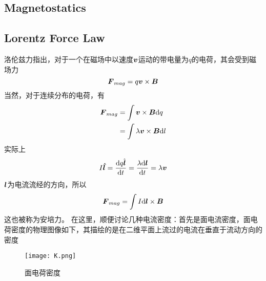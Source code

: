 \documentclass[14pt,oneside]{book}
\begin{document}
\begin{large}
\chapter{Magnetostatics}
\section{Lorentz Force Law}
洛伦兹力指出，对于一个在磁场中以速度$\vb*{v}$运动的带电量为$q$的电荷，其会受到磁场力
\begin{equation}
  \vb*{F}_{mag}=q\vb*{v}\times \vb*{B}
\end{equation}
当然，对于连续分布的电荷，有
\begin{equation}
\begin{aligned}
	 \vb*{ F}_{mag}&=\int \vb*{v}\times \vb*{B} \dd q\\
	 &=\int \lambda \vb*{v}\times \vb*{B} \dd l
\end{aligned}
\end{equation}
实际上
\begin{equation}
  I\vb*{\hat l}=\dv{q\hat{\vb*{l}}}{t}=\frac{\lambda\dd \vb*{l}}{\dd t}=\lambda \vb*{v}
\end{equation}
$\vb*{l}$为电流流经的方向，所以
\begin{equation}
  \vb*{F}_{mag}=\int I\dd \vb*{l}\times \vb*{B}
\end{equation}
这也被称为安培力。
在这里，顺便讨论几种电流密度：首先是面电流密度，面电荷密度的物理图像如下，其描绘的是在二维平面上流过的电流在垂直于流动方向的密度
\begin{figure}[H]
\centering
  \texttt{[image: K.png]}
  \caption{面电荷密度}
\end{figure}


\end{large}
\end{document}
